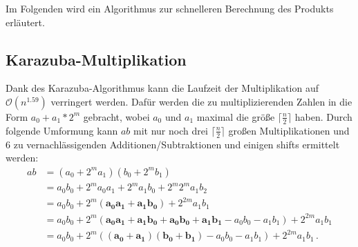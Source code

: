 \documentclass[course=erap]{aspdoc}
\begin{document}
Im Folgenden wird ein Algorithmus zur schnelleren Berechnung des Produkts erläutert.

\subsection{Karazuba-Multiplikation}
Dank des Karazuba-Algorithmus kann die Laufzeit der Multiplikation auf $\mathcal{O}(n^{1.59})$ verringert werden.
Dafür werden die zu multiplizierenden Zahlen in die Form $a_0+a_1*2^m$ gebracht, wobei $a_0$ und $a_1$ maximal die größe $\lceil\frac{n}{2}\rceil$ haben.
Durch folgende Umformung kann $ab$ mit nur noch drei $\lceil\frac{n}{2}\rceil$ großen Multiplikationen und 6 zu vernachlässigenden Additionen/Subtraktionen und einigen shifts ermittelt werden:
\begin{align*}
a b &= (a_0+2^ma_1) (b_0+2^mb_1)\\
      &= a_0b_0 + 2^ma_0a_1 + 2^ma_1b_0 + 2^m2^ma_1b_2\\
      &= a_0b_0 + 2^m(\mathbf{a_0a_1 + a_1b_0}) + 2^{2m}a_1b_1\\
      &= a_0b_0 + 2^m(\mathbf{a_0a_1 + a_1b_0 + a_0b_0 + a_1b_1} - a_0b_0 - a_1b_1) + 2^{2m}a_1b_1\\
      &= a_0b_0 + 2^m(\mathbf{(a_0+a_1)(b_0+b_1)} - a_0b_0 - a_1b_1) + 2^{2m}a_1b_1 \, .
\end{align*}
\end{document}
